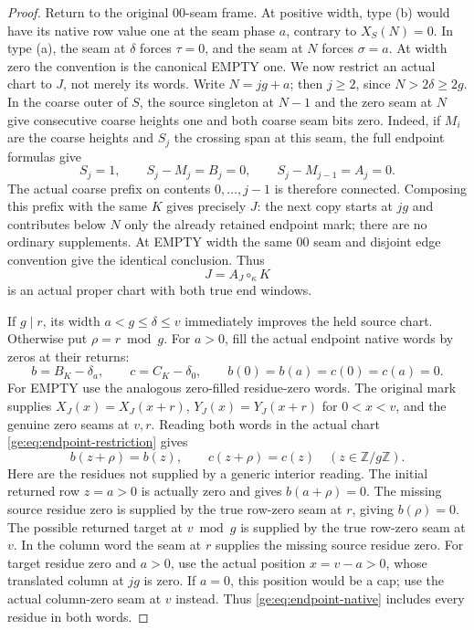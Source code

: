 \documentclass[11pt,a4paper]{amsart}
\numberwithin{equation}{section}
\theoremstyle{plain}
\theoremstyle{definition}
\newcommand{\Z}{\mathbb Z}
\begin{document}
\begin{proof}
Return to the original \(00\)-seam frame.  At positive width, type
(b) would have its native row value one at the seam phase \(a\),
contrary to \(X_S(N)=0\).  In type (a), the seam at \(\delta\)
forces \(\tau=0\), and the seam at \(N\) forces \(\sigma=a\).
At width zero the convention is the canonical EMPTY one.  We now
restrict an actual chart to \(J\), not merely its words.  Write
\(N=jg+a\); then \(j\ge2\), since \(N>2\delta\ge2g\).
In the coarse outer of \(S\), the source singleton at \(N-1\)
and the zero seam at \(N\) give consecutive coarse heights one and
both coarse seam bits zero.  Indeed, if \(M_i\) are the coarse
heights and \(S_j\) the crossing span at this seam, the full endpoint
formulas give
\[
 S_j=1,\qquad S_j-M_j=B_j=0,\qquad
 S_j-M_{j-1}=A_j=0.
\]
The actual coarse prefix on contents \(0,\ldots,j-1\) is therefore
connected.  Composing this prefix with the same \(K\) gives precisely
\(J\): the next copy starts at \(jg\) and contributes below
\(N\) only the already retained endpoint mark; there are no ordinary
supplements.  At EMPTY width the same \(00\) seam and disjoint edge
convention give the identical conclusion.  Thus
\begin{equation}\label{ge:eq:endpoint-restriction}
 J=A_J\circ_\kappa K
\end{equation}
is an actual proper chart with both true end windows.

If \(g\mid r\), its width \(a<g\le\delta\le v\) immediately
improves the held source chart.  Otherwise put \(\rho=r\bmod g\).
For \(a>0\), fill the actual endpoint native words by zeros at their
returns:
\[
 b=B_K-\delta_a,\qquad c=C_K-\delta_0,\qquad
 b(0)=b(a)=c(0)=c(a)=0.
\]
For EMPTY use the analogous zero-filled residue-zero words.  The original
mark supplies \(X_J(x)=X_J(x+r)\), \(Y_J(x)=Y_J(x+r)\) for
\(0<x<v\), and the genuine zero seams at \(v,r\).  Reading both
words in the actual chart \eqref{ge:eq:endpoint-restriction} gives
\begin{equation}\label{ge:eq:endpoint-native}
 b(z+\rho)=b(z),\qquad c(z+\rho)=c(z)\quad(z\in\Z/g\Z).
\end{equation}
Here are the residues not supplied by a generic interior reading.
The initial returned row \(z=a>0\) is actually zero and gives
\(b(a+\rho)=0\).  The missing source residue zero is supplied by
the true row-zero seam at \(r\), giving \(b(\rho)=0\).  The
possible returned target at \(v\bmod g\) is supplied by the true
row-zero seam at \(v\).  In the column word the seam at \(r\)
supplies the missing source residue zero.  For target residue zero and
\(a>0\), use the actual position \(x=v-a>0\), whose translated
column at \(jg\) is zero.  If \(a=0\), this position would be a
cap; use the actual column-zero seam at \(v\) instead.  Thus
\eqref{ge:eq:endpoint-native} includes every residue in both words.


\end{proof}
\end{document}
